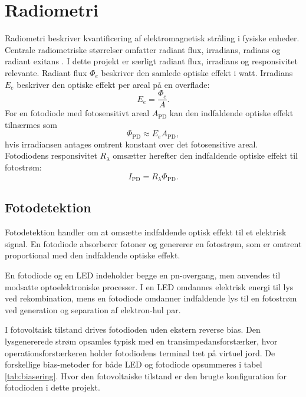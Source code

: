\section{Radiometri}
Radiometri beskriver kvantificering af elektromagnetisk stråling i fysiske enheder. Centrale radiometriske størrelser omfatter radiant flux, irradians, radians og radiant exitans \cite[s.~423]{Pedrotti2017}. I dette projekt er særligt radiant flux, irradians og responsivitet relevante. Radiant flux $\Phi_e$ beskriver den samlede optiske effekt i watt. Irradians $E_e$ beskriver den optiske effekt per areal på en overflade:
\begin{equation}
    E_e=\frac{\Phi_e}{A}.
\end{equation}
For en fotodiode med fotosensitivt areal $A_{\mathrm{PD}}$ kan den indfaldende optiske effekt tilnærmes som
\begin{equation}
    \Phi_{\mathrm{PD}}\approx E_e A_{\mathrm{PD}},
\end{equation}
hvis irradiansen antages omtrent konstant over det fotosensitive areal. Fotodiodens responsivitet $R_\lambda$ omsætter herefter den indfaldende optiske effekt til fotostrøm:
\begin{equation}
    I_{\mathrm{PD}}=R_\lambda \Phi_{\mathrm{PD}}.
\end{equation}

    \subsection{Fotodetektion}

Fotodetektion handler om at omsætte indfaldende optisk effekt til et elektrisk signal. En fotodiode absorberer fotoner og genererer en fotostrøm, som er omtrent proportional med den indfaldende optiske effekt.

En fotodiode og en LED indeholder begge en pn-overgang, men anvendes til modsatte optoelektroniske processer. I en LED omdannes elektrisk energi til lys ved rekombination, mens en fotodiode omdanner indfaldende lys til en fotostrøm ved generation og separation af elektron-hul par.

I fotovoltaisk tilstand drives fotodioden uden ekstern reverse bias. Den lysgenererede strøm opsamles typisk med en transimpedansforstærker, hvor operationsforstærkeren holder fotodiodens terminal tæt på virtuel jord. De forskellige bias-metoder for både LED og fotodiode opsummeres i tabel \ref{tab:biasering}. Hvor den fotovoltaiske tilstand er den brugte konfiguration for fotodioden i dette projekt. 

